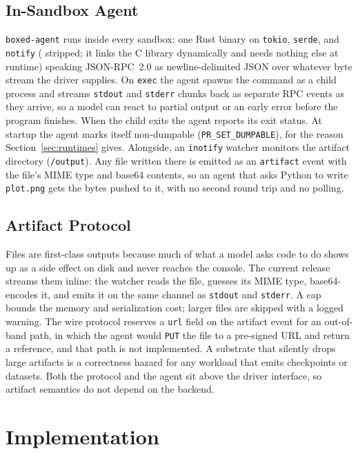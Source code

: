 \documentclass[conference]{IEEEtran}
\begin{document}
\subsection{In-Sandbox Agent}
\texttt{boxed-agent} runs inside every sandbox: one Rust binary on
\texttt{tokio}, \texttt{serde}, and \texttt{notify}
(\BoxedAgentBinSize{} stripped; it links the C library dynamically and
needs nothing else at runtime) speaking JSON-RPC~2.0 as newline-delimited
JSON over whatever byte stream the driver supplies. On \texttt{exec} the
agent spawns the command as a child process and streams
\texttt{stdout} and \texttt{stderr} chunks back as separate RPC events as
they arrive, so a model can react to partial output or an early error before
the program finishes. When the child exits the agent reports its exit
status. At startup the agent marks itself non-dumpable
(\texttt{PR\_SET\_DUMPABLE}), for the reason Section~\ref{sec:runtimes}
gives. Alongside, an \texttt{inotify} watcher monitors the
artifact directory (\texttt{/output}). Any file written there is emitted as
an \texttt{artifact} event with the file's MIME type and base64 contents,
so an agent that asks Python to write \texttt{plot.png} gets the bytes
pushed to it, with no second round trip and no polling.

\subsection{Artifact Protocol}
Files are first-class outputs because much of what a model asks code to do
shows up as a side effect on disk and never reaches the console. The
current release streams them inline: the watcher reads the file, guesses
its MIME type, base64-encodes it, and emits it on the same channel as
\texttt{stdout} and \texttt{stderr}. A \BoxedInlineCap{} cap bounds the
memory and serialization cost; larger files are skipped with a logged
warning. The wire protocol reserves a \texttt{url} field on the artifact
event for an out-of-band path, in which the agent would \texttt{PUT} the
file to a pre-signed URL and return a reference, and that path is not
implemented. A substrate that silently drops large artifacts is a correctness hazard for
any workload that emits checkpoints or datasets. Both the protocol and the agent sit above the driver interface,
so artifact semantics do not depend on the backend.

\section{Implementation}\label{sec:impl}
\end{document}
